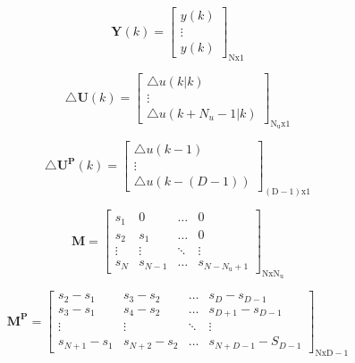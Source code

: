 		\begin{equation}
		\boldsymbol{Y}(k)=\left[
		\begin{array}{c}
		y(k)\\
		\vdots\\
		y(k)
		\end{array}
		\right]_{\mathrm{Nx1}}
		\label{ym}
		\end{equation}
		
		\begin{equation}
		\triangle\boldsymbol{U}(k)=\left[
		\begin{array}{c}
		\triangle u(k|k)\\
		\vdots\\
		\triangle u(k+N_u -1 |k)
		\end{array}
		\right]_{\mathrm{N_ux1}}
		\label{dUm}
		\end{equation}
		
		\begin{equation}
		\triangle\boldsymbol{U^P}(k)=\left[
		\begin{array}{c}
		\triangle u(k-1)\\
		\vdots\\
		\triangle u(k-(D-1))
		\end{array}
		\right]_{\mathrm{(D-1)x1}}
		\label{dUPm}
		\end{equation}
		
		\begin{equation}
		\boldsymbol{M}=\left[
		\begin{array}
		{cccc}
		s_{1} & 0 & \ldots & 0\\
		s_{2} & s_{1} & \ldots & 0\\
		\vdots & \vdots & \ddots & \vdots\\
		s_{N} & s_{N-1} & \ldots &  s_{N-N_{\mathrm{u}}+1}
		\end{array}
		\right]_{\mathrm{NxN_u}}
		\label{Mm}
		\end{equation}
		
		\begin{equation}
		\boldsymbol{M^P}=\left[
		\begin{array}
		{cccc}
		s_{2}-s_{1} & s_{3}-s_{2} & \ldots & s_{D}-s_{D-1}\\
		s_{3}-s_{1} & s_{4}-s_{2} & \ldots & s_{D+1}-s_{D-1}\\
		\vdots & \vdots & \ddots & \vdots\\
		s_{N+1}-s_{1} & s_{N+2}-s_{2} & \ldots &  s_{N+D-1}-S_{D-1}
		\end{array}
		\right]_{\mathrm{NxD-1}}
		\label{MPm}
		\end{equation}
		
